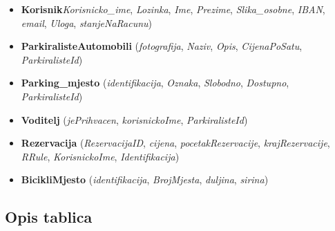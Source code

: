 		\begin{itemize}
			\item \textbf{Korisnik}\textit{Korisnicko\_ime}, \textit{Lozinka}, \textit{Ime}, \textit{Prezime}, \textit{Slika\_osobne}, \textit{IBAN}, \textit{email}, \textit{Uloga}, \textit{stanjeNaRacunu})
			
			
			\item \textbf{ParkiralisteAutomobili} (\textit{fotografija}, \textit{Naziv}, \textit{Opis}, \textit{CijenaPoSatu}, \textit{ParkiralisteId}) 
			
			\item \textbf{Parking\_mjesto} (\textit{identifikacija}, \textit{Oznaka}, \textit{Slobodno}, \textit{Dostupno}, \textit{ParkiralisteId})
			
			\item \textbf{Voditelj} (\textit{jePrihvacen}, \textit{korisnickoIme}, \textit{ParkiralisteId})
			
			\item \textbf{Rezervacija} (\textit{RezervacijaID}, \textit{cijena}, \textit{pocetakRezervacije}, \textit{krajRezervacije}, \textit{RRule}, \textit{KorisnickoIme}, \textit{Identifikacija})
			
			\item \textbf{BicikliMjesto} (\textit{identifikacija}, \textit{BrojMjesta}, \textit{duljina}, \textit{sirina})
		\end{itemize}
		
		
		
			\subsection{Opis tablica}
			

				
			
